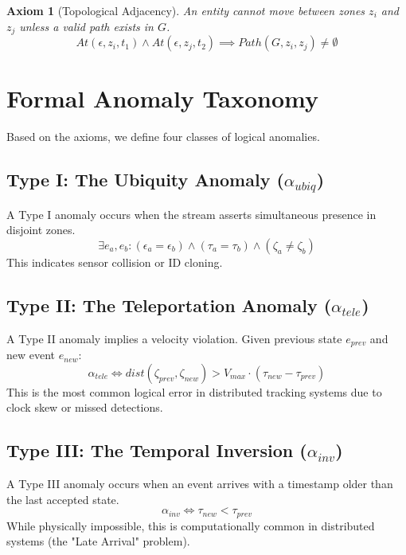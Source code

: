 \documentclass[conference]{IEEEtran}
\newtheorem{axiom}{Axiom}
\begin{document}
\begin{axiom}[Topological Adjacency]
An entity cannot move between zones $z_i$ and $z_j$ unless a valid path exists in $G$.
\begin{equation}
At(\epsilon, z_i, t_1) \land At(\epsilon, z_j, t_2) \implies Path(G, z_i, z_j) \neq \emptyset
\end{equation}
\end{axiom}

\section{Formal Anomaly Taxonomy}

Based on the axioms, we define four classes of logical anomalies.

\subsection{Type I: The Ubiquity Anomaly ($\alpha_{ubiq}$)}
A Type I anomaly occurs when the stream asserts simultaneous presence in disjoint zones.
\begin{equation}
\exists e_a, e_b: (\epsilon_a = \epsilon_b) \land (\tau_a = \tau_b) \land (\zeta_a \neq \zeta_b)
\end{equation}
This indicates sensor collision or ID cloning.

\subsection{Type II: The Teleportation Anomaly ($\alpha_{tele}$)}
A Type II anomaly implies a velocity violation. Given previous state $e_{prev}$ and new event $e_{new}$:
\begin{equation}
\alpha_{tele} \iff dist(\zeta_{prev}, \zeta_{new}) > V_{max} \cdot (\tau_{new} - \tau_{prev})
\end{equation}
This is the most common logical error in distributed tracking systems due to clock skew or missed detections.

\subsection{Type III: The Temporal Inversion ($\alpha_{inv}$)}
A Type III anomaly occurs when an event arrives with a timestamp older than the last accepted state.
\begin{equation}
\alpha_{inv} \iff \tau_{new} < \tau_{prev}
\end{equation}
While physically impossible, this is computationally common in distributed systems (the "Late Arrival" problem).
\end{document}
